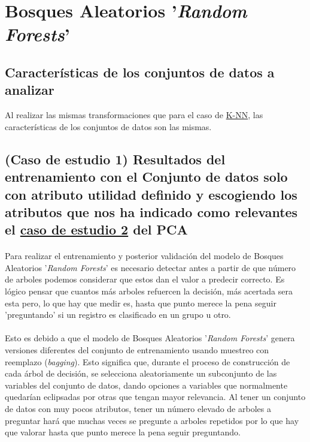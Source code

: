 \section{Bosques Aleatorios '\textit{Random Forests}'}
\label{resultados:rf}

\subsection{Características de los conjuntos de datos a analizar}
\label{resultados:rf_caracteristicas}
Al realizar las mismas transformaciones que para el caso de \hyperref[resultados:knn_caracteristicas]{K-NN}, las características de los conjuntos de datos son las mismas.

\subsection{(Caso de estudio 1) Resultados del entrenamiento con el Conjunto de datos solo con atributo utilidad definido y escogiendo los atributos que nos ha indicado como relevantes el \hyperref[result:pca_case2]{caso de estudio 2} del PCA}

\paragraph{}
Para realizar el entrenamiento y posterior validación del modelo de Bosques Aleatorios '\textit{Random Forests}' es necesario detectar antes a partir de que número de arboles podemos considerar que estos dan el valor a predecir correcto. Es lógico pensar que cuantos más arboles refuercen la decisión, más acertada sera esta pero, lo que hay que medir es, hasta que punto merece la pena seguir 'preguntando' si un registro es clasificado en un grupo u otro.

\paragraph{}
Esto es debido a que el modelo de Bosques Aleatorios '\textit{Random Forests}'\cite{ref:rf_def} genera versiones diferentes del conjunto de entrenamiento usando muestreo con reemplazo (\textit{bagging}\cite{ref:rf_bagging}). Esto significa que, durante el proceso de construcción de cada árbol de decisión, se selecciona aleatoriamente un subconjunto de las variables del conjunto de datos, dando opciones a variables que normalmente quedarían eclipsadas por otras que tengan mayor relevancia. Al tener un conjunto de datos con muy pocos atributos, tener un número elevado de arboles a preguntar hará que muchas veces se pregunte a arboles repetidos por lo que hay que valorar hasta que punto merece la pena seguir preguntando.

